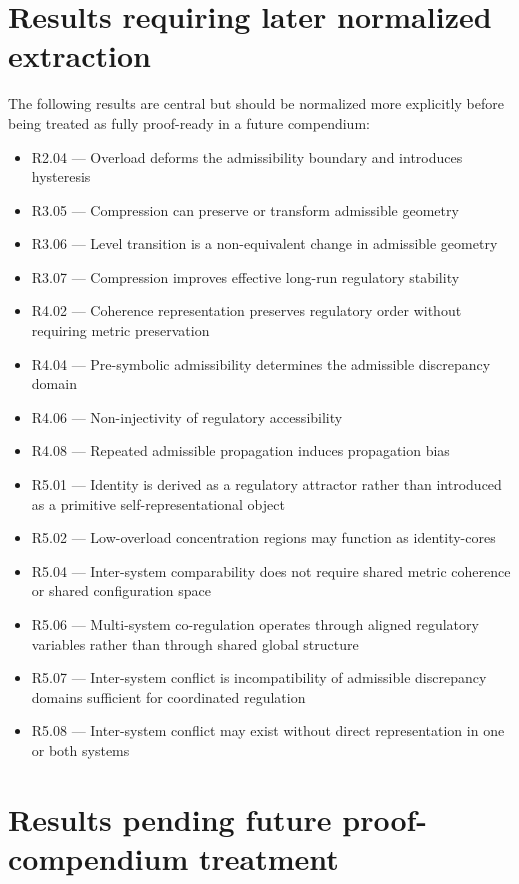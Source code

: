 \documentclass[12pt]{article}
\begin{document}
	\section{Results requiring later normalized extraction}
	
	The following results are central but should be normalized more explicitly before being treated
	as fully proof-ready in a future compendium:
	
	\begin{itemize}[leftmargin=2em]
		\item R2.04 --- Overload deforms the admissibility boundary and introduces hysteresis
		\item R3.05 --- Compression can preserve or transform admissible geometry
		\item R3.06 --- Level transition is a non-equivalent change in admissible geometry
		\item R3.07 --- Compression improves effective long-run regulatory stability
		\item R4.02 --- Coherence representation preserves regulatory order without requiring metric preservation
		\item R4.04 --- Pre-symbolic admissibility determines the admissible discrepancy domain
		\item R4.06 --- Non-injectivity of regulatory accessibility
		\item R4.08 --- Repeated admissible propagation induces propagation bias
		\item R5.01 --- Identity is derived as a regulatory attractor rather than introduced as a primitive self-representational object
		\item R5.02 --- Low-overload concentration regions may function as identity-cores
		\item R5.04 --- Inter-system comparability does not require shared metric coherence or shared configuration space
		\item R5.06 --- Multi-system co-regulation operates through aligned regulatory variables rather than through shared global structure
		\item R5.07 --- Inter-system conflict is incompatibility of admissible discrepancy domains sufficient for coordinated regulation
		\item R5.08 --- Inter-system conflict may exist without direct representation in one or both systems
	\end{itemize}
	
	\section{Results pending future proof-compendium treatment}
	
\end{document}
